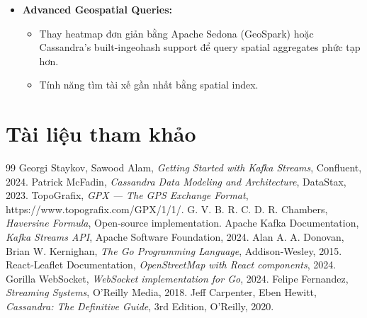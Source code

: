 \begin{itemize}
    \item \textbf{Advanced Geospatial Queries:}
    \begin{itemize}
        \item Thay heatmap đơn giản bằng Apache Sedona (GeoSpark) hoặc Cassandra's built-ingeohash support để query spatial aggregates phức tạp hơn.
        \item Tính năng tìm tài xế gần nhất bằng spatial index.
    \end{itemize}
\end{itemize}

\section*{Tài liệu tham khảo}

\begin{thebibliography}{99}
     Georgi Staykov, Sawood Alam, \textit{Getting Started with Kafka Streams}, Confluent, 2024.
     Patrick McFadin, \textit{Cassandra Data Modeling and Architecture}, DataStax, 2023.
     TopoGrafix, \textit{GPX — The GPS Exchange Format}, https://www.topografix.com/GPX/1/1/.
     G. V. B. R. C. D. R. Chambers, \textit{Haversine Formula}, Open-source implementation.
     Apache Kafka Documentation, \textit{Kafka Streams API}, Apache Software Foundation, 2024.
     Alan A. A. Donovan, Brian W. Kernighan, \textit{The Go Programming Language}, Addison-Wesley, 2015.
     React-Leaflet Documentation, \textit{OpenStreetMap with React components}, 2024.
     Gorilla WebSocket, \textit{WebSocket implementation for Go}, 2024.
     Felipe Fernandez, \textit{Streaming Systems}, O'Reilly Media, 2018.
     Jeff Carpenter, Eben Hewitt, \textit{Cassandra: The Definitive Guide}, 3rd Edition, O'Reilly, 2020.
\end{thebibliography}
